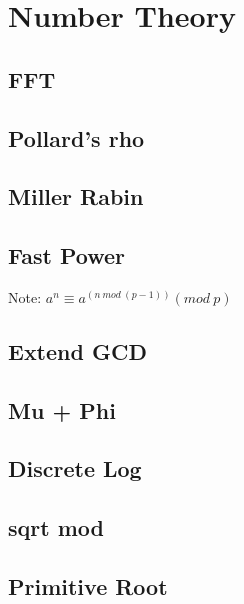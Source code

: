 \documentclass[a4paper,10pt,twocolumn,oneside,x11names]{article}
\begin{document}
\section{Number Theory}

\subsection{FFT}


\subsection{Pollard's rho}


\subsection{Miller Rabin}


\subsection{Fast Power}
{ \normalsize
Note: $a^n \equiv a^{(n \ mod \ (p-1))} (mod \ p)$
}

\subsection{Extend GCD}


\subsection{Mu + Phi}


\subsection{Discrete Log}


\subsection{sqrt mod}


\subsection{Primitive Root}

\end{document}
